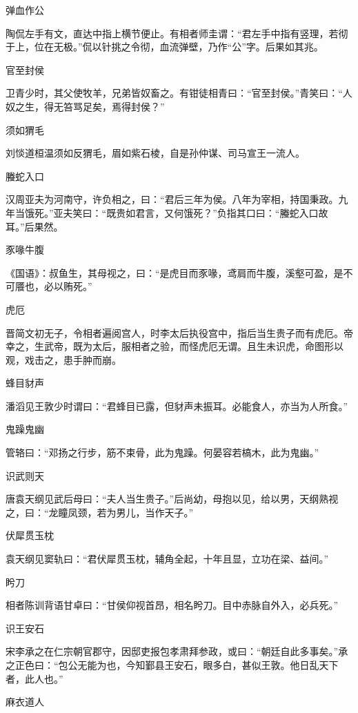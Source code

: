 \documentclass[a4paper,12pt,UTF8,twoside]{ctexbook}
\begin{document}
    弹血作公
    
    陶侃左手有文，直达中指上横节便止。有相者师圭谓：“君左手中指有竖理，若彻于上，位在无极。”侃以针挑之令彻，血流弹壁，乃作“公”字。后果如其兆。
    
    官至封侯
    
    卫青少时，其父使牧羊，兄弟皆奴畜之。有钳徒相青曰：“官至封侯。”青笑曰：“人奴之生，得无笞骂足矣，焉得封侯？”
    
    须如猬毛
    
    刘惔道桓温须如反猬毛，眉如紫石棱，自是孙仲谋、司马宣王一流人。
    
    螣蛇入口
    
    汉周亚夫为河南守，许负相之，曰：“君后三年为侯。八年为宰相，持国秉政。九年当饿死。”亚夫笑曰：“既贵如君言，又何饿死？”负指其口曰：“螣蛇入口故耳。”后果然。
    
    豕喙牛腹
    
    《国语》：叔鱼生，其母视之，曰：“是虎目而豕喙，鸢肩而牛腹，溪壑可盈，是不可餍也，必以贿死。”
    
    虎厄
    
    晋简文初无子，令相者遍阅宫人，时李太后执役宫中，指后当生贵子而有虎厄。帝幸之，生武帝，既为太后，服相者之验，而怪虎厄无谓。且生未识虎，命图形以观，戏击之，患手肿而崩。
    
    蜂目豺声
    
    潘滔见王敦少时谓曰：“君蜂目已露，但豺声未振耳。必能食人，亦当为人所食。”
    
    鬼躁鬼幽
    
    管辂曰：“邓扬之行步，筋不束骨，此为鬼躁。何晏容若槁木，此为鬼幽。”
    
    识武则天
    
    唐袁天纲见武后母曰：“夫人当生贵子。”后尚幼，母抱以见，给以男，天纲熟视之，曰：“龙瞳凤颈，若为男儿，当作天子。”
    
    伏犀贯玉枕
    
    袁天纲见窦轨曰：“君伏犀贯玉枕，辅角全起，十年且显，立功在梁、益间。”
    
    盻刀
    
    相者陈训背语甘卓曰：“甘侯仰视首昂，相名盻刀。目中赤脉自外入，必兵死。”
    
    识王安石
    
    宋李承之在仁宗朝官郡守，因邸吏报包孝肃拜参政，或曰：“朝廷自此多事矣。”承之正色曰：“包公无能为也，今知鄞县王安石，眼多白，甚似王敦。他日乱天下者，此人也。”
    
    麻衣道人
    
\end{document}
